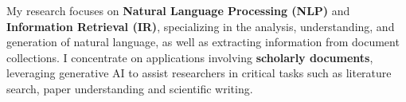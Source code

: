 My research focuses on \textbf{Natural Language Processing (NLP)} and \textbf{Information Retrieval (IR)}, specializing in the analysis, understanding, and generation of natural language, as well as extracting information from document collections.
I concentrate on applications involving \textbf{scholarly documents}, leveraging generative AI to assist researchers in critical tasks such as literature search, paper understanding and scientific writing. 